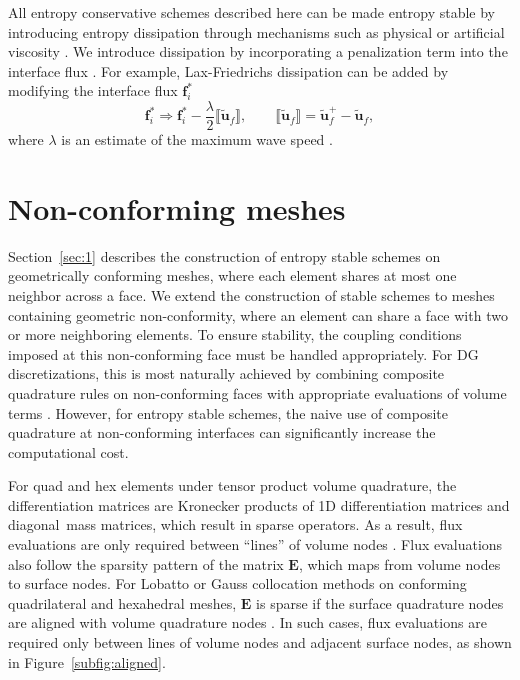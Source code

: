 \documentclass{svjour3}                     %
\renewcommand{\tilde}{\widetilde}
\newcommand{\jump}[1] {\ensuremath{\llbracket#1\rrbracket}}
\begin{document}
All entropy conservative schemes described here can be made entropy stable by introducing entropy dissipation through mechanisms such as physical or artificial viscosity \cite{tadmor2006entropy,upperman2019entropy}.  We introduce dissipation by incorporating a penalization term into the interface flux \cite{winters2017uniquely}.  For example, Lax-Friedrichs dissipation can be added by modifying the interface flux $\bm{f}^*_i$ 
\[
\bm{f}^*_i \Longrightarrow \bm{f}^*_i - \frac{\lambda}{2} \jump{\tilde{\bm{u}}_f}, \qquad  \jump{\tilde{\bm{u}}_f} = \tilde{\bm{u}}_f^+ - \tilde{\bm{u}}_f,
\]
where $\lambda$ is an estimate of the maximum wave speed \cite{chen2017entropy, chan2017discretely}.  

\section{Non-conforming meshes}
\label{sec:2}

Section~\ref{sec:1} describes the construction of entropy stable schemes on geometrically conforming meshes, where each element shares at most one neighbor across a face.  We extend the construction of stable schemes to meshes containing geometric non-conformity, where an element can share a face with two or more neighboring elements.  To ensure stability, the coupling conditions imposed at this non-conforming face must be handled appropriately.  For DG discretizations, this is most naturally achieved by combining composite quadrature rules on non-conforming faces with appropriate evaluations of volume terms \cite{kozdon2018energy}.  However, for entropy stable schemes, the naive use of composite quadrature at non-conforming interfaces can significantly increase the computational cost.

For quad and hex elements under tensor product volume quadrature, the differentiation matrices are Kronecker products of 1D differentiation matrices and diagonal mass matrices, which result in sparse operators.  As a result, flux evaluations are only required between ``lines'' of volume nodes \cite{carpenter2014entropy, chan2018efficient}.  Flux evaluations also follow the sparsity pattern of the matrix $\bm{E}$, which maps from volume nodes to surface nodes.  For Lobatto or Gauss collocation methods on conforming quadrilateral and hexahedral meshes, $\bm{E}$ is sparse if the surface quadrature nodes are aligned with volume quadrature nodes \cite{chan2018efficient}.  In such cases, flux evaluations are required only between lines of volume nodes and adjacent surface nodes, as shown in Figure~\ref{subfig:aligned}.
\end{document}
